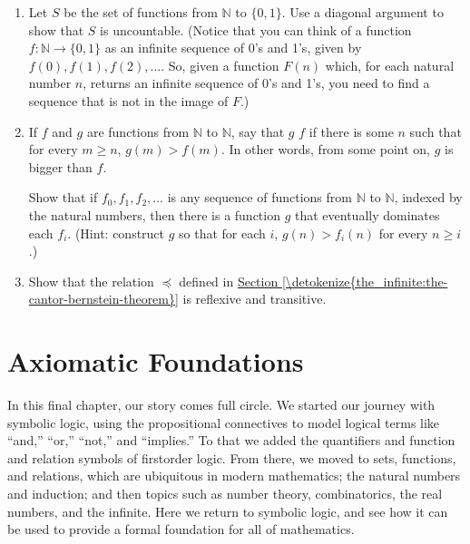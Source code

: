 \documentclass[letterpaper,10pt,english]{sphinxmanual}
\begin{document}
\begin{enumerate}
\begin{enumerate}
\end{enumerate}

\item {} 
\sphinxAtStartPar
Let \(S\) be the set of functions from \(\mathbb{N}\) to \(\{ 0, 1\}\). Use a diagonal argument to show that \(S\) is uncountable. (Notice that you can think of a function \(f: \mathbb{N} \to \{0, 1\}\) as an infinite sequence of 0’s and 1’s, given by \(f(0), f(1), f(2), \ldots\). So, given a function \(F(n)\) which, for each natural number \(n\), returns an infinite sequence of 0’s and 1’s, you need to find a sequence that is not in the image of \(F\).)

\item {} 
\sphinxAtStartPar
If \(f\) and \(g\) are functions from \(\mathbb{N}\) to \(\mathbb{N}\), say that \(g\)  \(f\) if there is some \(n\) such that for every \(m \geq n\), \(g(m) > f(m)\). In other words, from some point on, \(g\) is bigger than \(f\).

\sphinxAtStartPar
Show that if \(f_0, f_1, f_2, \ldots\) is any sequence of functions from \(\mathbb{N}\) to \(\mathbb{N}\), indexed by the natural numbers, then there is a function \(g\) that eventually dominates each \(f_i\). (Hint: construct \(g\) so that for each \(i\), \(g(n) > f_i(n)\) for every \(n \geq i\).)

\item {} 
\sphinxAtStartPar
Show that the relation \(\preceq\) defined in \hyperref[\detokenize{the_infinite:the-cantor-bernstein-theorem}]{Section \ref{\detokenize{the_infinite:the-cantor-bernstein-theorem}}} is reflexive and transitive.

\end{enumerate}


\chapter{Axiomatic Foundations}
\label{\detokenize{axiomatic_foundations:axiomatic-foundations}}\label{\detokenize{axiomatic_foundations:id1}}\label{\detokenize{axiomatic_foundations::doc}}
\sphinxAtStartPar
In this final chapter, our story comes full circle. We started our journey with symbolic logic, using the propositional connectives to model logical terms like “and,” “or,” “not,” and “implies.” To that we added the quantifiers and function and relation symbols of first\sphinxhyphen{}order logic. From there, we moved to sets, functions, and relations, which are ubiquitous in modern mathematics; the natural numbers and induction; and then topics such as number theory, combinatorics, the real numbers, and the infinite. Here we return to symbolic logic, and see how it can be used to provide a formal foundation for all of mathematics.
\end{document}
